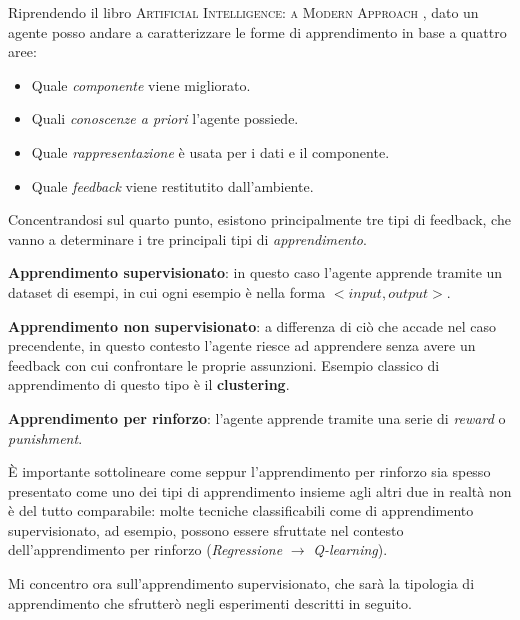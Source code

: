 \documentclass[../../main.tex]{subfiles}
\begin{document}
    Riprendendo il libro \textsc{Artificial Intelligence: a Modern Approach} \cite{russel2010}, dato un agente posso andare a caratterizzare le forme di apprendimento in base a quattro aree:

    \begin{itemize}
        \item Quale \textit{componente} viene migliorato.
        \item Quali \textit{conoscenze a priori} l'agente possiede.
        \item Quale \textit{rappresentazione} è usata per i dati e il componente.
        \item Quale \textit{feedback} viene restitutito dall'ambiente.
    \end{itemize}

    Concentrandosi sul quarto punto, esistono principalmente tre tipi di feedback, che vanno a determinare i tre principali tipi di \textit{apprendimento}.

    \textbf{Apprendimento supervisionato}: in questo caso l'agente apprende tramite un dataset di esempi, in cui ogni esempio è nella forma $<input, output>$.

    \textbf{Apprendimento non supervisionato}: a differenza di ciò che accade nel caso precendente, in questo contesto l'agente riesce ad apprendere senza avere un feedback con cui confrontare le proprie assunzioni. Esempio classico di apprendimento di questo tipo è il \textbf{clustering}.

    \textbf{Apprendimento per rinforzo}: l'agente apprende tramite una serie di \textit{reward} o \textit{punishment}.

    È importante sottolineare come seppur l'apprendimento per rinforzo sia spesso presentato come uno dei tipi di apprendimento insieme agli altri due in realtà non è del tutto comparabile: molte tecniche classificabili come di apprendimento supervisionato, ad esempio, possono essere sfruttate nel contesto dell'apprendimento per rinforzo (\textit{Regressione} $\rightarrow$ \textit{Q-learning}).

    Mi concentro ora sull'apprendimento supervisionato, che sarà la tipologia di apprendimento che sfrutterò negli esperimenti descritti in seguito.
    
\end{document}
